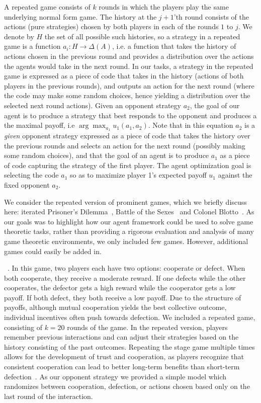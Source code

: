 A repeated game consists of $k$ rounds in which the players play the same underlying normal form game.
The history at the $j+1$'th round consists of the actions (pure strategies) chosen by both players in each of the rounds $1$ to $j$.
We denote by $H$ the set of all possible such histories, so a strategy in a repeated game is a function $a_i : H \rightarrow \Delta(A)$, i.e. a function that takes the history of actions chosen in the previous round and provides a distribution over the actions the agents would take in the next round.
In our tasks, a strategy in the repeated game is expressed as a piece of code that takes in the history (actions of both players in the previous rounds), and outputs an action for the next round (where the code may make some random choices, hence yielding a distribution over the selected next round actions).
Given an opponent strategy $a_2$, the goal of our agent is to produce a strategy that best responds to the opponent and produces a the maximal payoff, i.e $\arg \max_{a_1} u_1(a_1, a_2)$.
Note that in this equation $a_2$ is a {\it given} opponent strategy expressed as a piece of code that takes the history over the previous rounds and selects an action for the next round (possibly making some random choices), and that the goal of an agent is to produce $a_1$ as a piece of code capturing the strategy of the first player.
The agent optimization goal is selecting the code $a_1$ so as to maximize player 1's expected payoff $u_1$ against the fixed opponent $a_2$.

We consider the repeated version of prominent games, which we briefly discuss here: iterated Prisoner's Dilemma~\citep{flood1958some,fudenberg1991game,axelrod1980effective}, Battle of the Sexes~\citep{cooper1989communication,luce2012games} and Colonel Blotto~\citep{roberson2006colonel}. As our goals was to highlight how our agent framework could be used to solve game theoretic tasks, rather than providing a rigorous evaluation and analysis of many game theoretic environments, we only included few games. However, additional games could easily be added in.

~\citep{axelrod1980effective}. In this game, two players each have two options: cooperate or defect. When both cooperate, they receive a moderate reward. If one defects while the other cooperates, the defector gets a high reward while the cooperator gets a low payoff. If both defect, they both receive a low payoff. Due to the structure of payoffs, although mutual cooperation yields the best collective outcome, individual incentives often push towards defection. We included a repeated game, consisting of $k=20$ rounds of the game. In the repeated version, players remember previous interactions and can adjust their strategies based on the history consisting of the past outcomes. Repeating the stage game multiple times allows for the development of trust and cooperation, as players recognize that consistent cooperation can lead to better long-term benefits than short-term defection~\citep{axelrod1980effective}. As our opponent strategy we provided a simple model which randomizes between cooperation, defection, or actions chosen based only on the last round of the interaction. 

